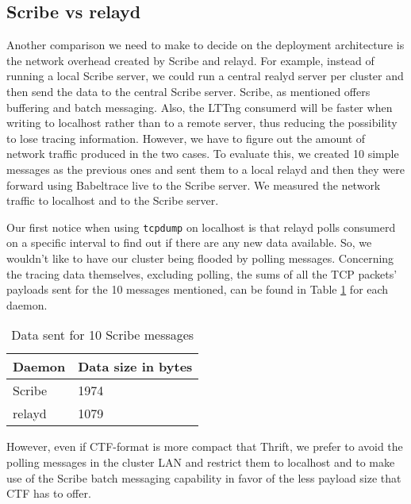 \subsection{Scribe vs relayd}
Another comparison we need to make to decide on the deployment architecture is
the network overhead created by Scribe and relayd. For example, instead of
running a local Scribe server, we could run a central realyd server per cluster
and then send the data to the central Scribe server.  Scribe, as mentioned
offers buffering and batch messaging. Also, the LTTng consumerd will be faster
when writing to localhost rather than to a remote server, thus reducing the
possibility to lose tracing information. However, we have to figure out the
amount of network traffic produced in the two cases. To evaluate this, we
created 10 simple messages as the previous ones and sent them to a local relayd
and then they were forward using Babeltrace live to the Scribe server. We
measured the network traffic to localhost and to the Scribe server.

Our first notice when using \texttt{tcpdump} on localhost is that relayd polls
consumerd on a specific interval to find out if there are any new data
available. So, we wouldn't like to have our cluster being flooded by polling
messages. Concerning the tracing data themselves, excluding polling, the sums of
all the TCP packets' payloads sent for the 10 messages mentioned, can be found
in Table \ref{tab:relayd-scribe} for each daemon.

\begin{table}[H]
    \centering
    \begin{tabular}{ | l | l | }
        \hline
        Daemon & Data size in bytes \\ \hline \hline
        Scribe & 1974 \\ \hline
        relayd  & 1079 \\ \hline
    \end{tabular}
    \caption{Data sent for 10 Scribe messages}
    \label{tab:relayd-scribe}
\end{table}

However, even if CTF-format is more compact that Thrift, we prefer to avoid the
polling messages in the cluster LAN and restrict them to localhost and to make
use of the Scribe batch messaging capability in favor of the less payload size
that CTF has to offer.

